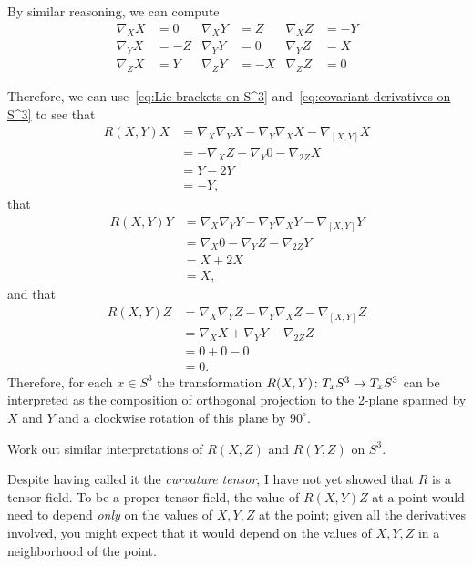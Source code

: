 \begin{example}
	By similar reasoning, we can compute
	\begin{align}\label{eq:covariant derivatives on S^3}
		\nabla_XX & = 0 & \nabla_XY & = Z  & \nabla_XZ & = -Y \nonumber\\
		\nabla_YX & = -Z & \nabla_YY & = 0 &  \nabla_YZ & = X \\
		\nabla_ZX & = Y & \nabla_ZY & = -X & \nabla_ZZ & = 0 \nonumber
	\end{align}
	
	Therefore, we can use~\eqref{eq:Lie brackets on S^3} and~\eqref{eq:covariant derivatives on S^3} to see that
	\begin{align*}
		R(X,Y)X & = \nabla_X\nabla_YX - \nabla_Y\nabla_XX - \nabla_{[X,Y]}X \\
		& = -\nabla_XZ - \nabla_Y 0 -\nabla_{2Z}X \\
		& = Y-2Y \\
		& = -Y,
	\end{align*}
	that
	\begin{align*}
		R(X,Y)Y & = \nabla_X\nabla_YY - \nabla_Y\nabla_XY - \nabla_{[X,Y]}Y \\
		& = \nabla_X0 - \nabla_Y Z -\nabla_{2Z}Y \\
		& = X+2X \\
		& = X,
	\end{align*}
	and that
	\begin{align*}
		R(X,Y)Z & = \nabla_X\nabla_YZ - \nabla_Y\nabla_XZ - \nabla_{[X,Y]}Z \\
		& = \nabla_XX + \nabla_Y Y -\nabla_{2Z}Z \\
		& = 0+0-0 \\
		& = 0.
	\end{align*}
	Therefore, for each $x \in S^3$ the transformation $R(X,Y) \colon\thinspace\! T_x S^3 \to T_xS^3$ can be interpreted as the composition of orthogonal projection to the 2-plane spanned by $X$ and $Y$ and a clockwise rotation of this plane by $90^\circ$.
\end{example}

\begin{exercise}
	Work out similar interpretations of $R(X,Z)$ and $R(Y,Z)$ on $S^3$.
\end{exercise}

Despite having called it the \emph{curvature tensor}, I have not yet showed that $R$ is a tensor field. To be a proper tensor field, the value of $R(X,Y)Z$ at a point would need to depend \emph{only} on the values of $X,Y,Z$ at the point; given all the derivatives involved, you might expect that it would depend on the values of $X,Y,Z$ in a neighborhood of the point. 


